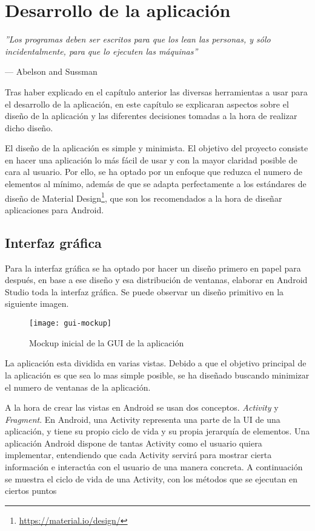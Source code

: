 \chapter{Desarrollo de la aplicación}

\epigraph{\textit{''Los programas deben ser escritos para que los lean las personas, y sólo incidentalmente, para que lo ejecuten las máquinas''}}{--- Abelson and Sussman}

Tras haber explicado en el capítulo anterior las diversas herramientas a usar para el desarrollo de la aplicación, en este capítulo se explicaran aspectos sobre el diseño de la aplicación y las diferentes decisiones tomadas a la hora de realizar dicho diseño.

El diseño de la aplicación es simple y minimista. El objetivo del proyecto consiste en hacer una aplicación lo más fácil de usar y con la mayor claridad posible de cara al usuario. Por ello, se ha optado por un enfoque que reduzca el numero de elementos al mínimo, además de que se adapta perfectamente a los estándares de diseño de Material Design\footnote{\url{https://material.io/design/}}, que son los recomendados a la hora de diseñar aplicaciones para Android.

\section{Interfaz gráfica}

Para la interfaz gráfica se ha optado por hacer un diseño primero en papel para después, en base a ese diseño y esa distribución de ventanas, elaborar en Android Studio toda la interfaz gráfica. Se puede observar un diseño primitivo en la siguiente imagen.

\begin{figure}[ht]
	\centering
	\texttt{[image: gui-mockup]}
	\caption{Mockup inicial de la GUI de la aplicación}
	\label{fig:mockup}
\end{figure}

La aplicación esta dividida en varias vistas. Debido a que el objetivo principal de la aplicación es que sea lo mas simple posible, se ha diseñado buscando minimizar el numero de ventanas de la aplicación.

A la hora de crear las vistas en Android se usan dos conceptos. \textit{Activity} y \textit{Fragment}. En Android, una Activity representa una parte de la UI de una aplicación, y tiene su propio ciclo de vida y su propia jerarquía de elementos. Una aplicación Android dispone de tantas Activity como el usuario quiera implementar, entendiendo que cada Activity servirá para mostrar cierta información e interactúa con el usuario de una manera concreta. A continuación se muestra el ciclo de vida de una Activity, con los métodos que se ejecutan en ciertos puntos


